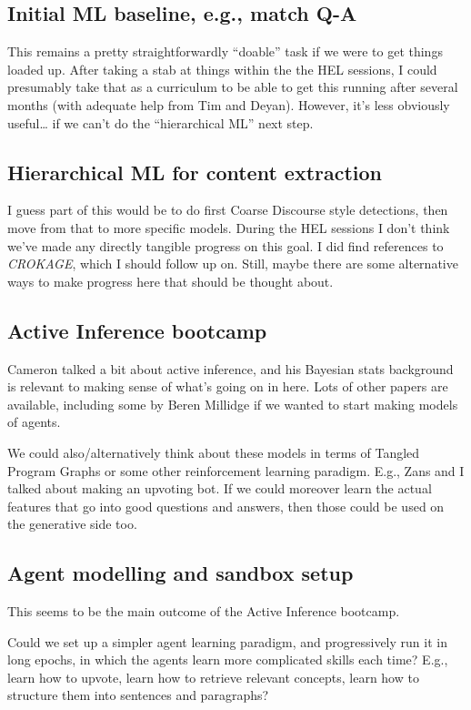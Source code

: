\documentclass[11pt]{article}
\begin{document}
\subsection{Initial ML baseline, e.g., match Q-A}
\label{sec:org7e56bfe}

This remains a pretty straightforwardly “doable” task if we were to
get things loaded up.  After taking a stab at things within the the
HEL sessions, I could presumably take that as a curriculum to be able
to get this running after several months (with adequate help from Tim
and Deyan).  However, it’s less obviously useful\ldots{} if we can’t do the
“hierarchical ML” next step.
\subsection{Hierarchical ML for content extraction}
\label{sec:orgeea4342}

I guess part of this would be to do first Coarse Discourse style
detections, then move from that to more specific models.  During the
HEL sessions I don’t think we’ve made any directly tangible progress
on this goal.  I did find references to \emph{CROKAGE}, which I should follow
up on.  Still, maybe there are some alternative ways to make progress
here that should be thought about.
\subsection{Active Inference bootcamp}
\label{sec:org91d142a}

Cameron talked a bit about active inference, and his Bayesian stats
background is relevant to making sense of what’s going on in here.
Lots of other papers are available, including some by Beren Millidge
if we wanted to start making models of agents.

We could also/alternatively think about these models in terms of
Tangled Program Graphs or some other reinforcement learning paradigm.
E.g., Zans and I talked about making an upvoting bot.  If we could
moreover learn the actual features that go into good questions and
answers, then those could be used on the generative side too.
\subsection{Agent modelling and sandbox setup}
\label{sec:org07c23fa}

This seems to be the main outcome of the Active Inference bootcamp.

Could we set up a simpler agent learning paradigm, and progressively
run it in long epochs, in which the agents learn more complicated
skills each time?  E.g., learn how to upvote, learn how to retrieve
relevant concepts, learn how to structure them into sentences and
paragraphs?
\end{document}
